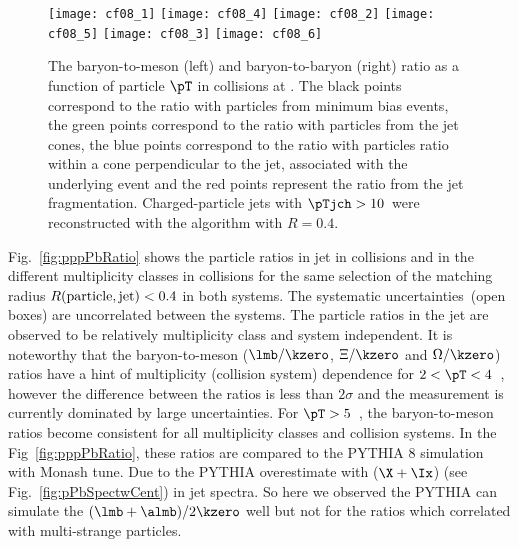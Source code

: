 \documentclass[ALICE,manyauthors]{cernphprep}
\begin{document}
\begin{figure}[!ht]
	\begin{center}
		\texttt{[image: cf08\_1]}
		\texttt{[image: cf08\_4]}
		\texttt{[image: cf08\_2]}
		\texttt{[image: cf08\_5]}
		\texttt{[image: cf08\_3]}
		\texttt{[image: cf08\_6]}
	\end{center}
	\caption{The baryon-to-meson (left) and baryon-to-baryon (right) ratio as a function of particle $\pT$ in \pPb collisions at \fivenn. The black points correspond to the ratio with particles from minimum bias events, the green points correspond to the ratio with particles from the jet cones, the blue points correspond to the ratio with particles ratio within a cone perpendicular to the jet, associated with the underlying event and the red points represent the ratio from the jet fragmentation. Charged-particle jets with $\pTjch > 10$~\GeVc were reconstructed with the \akT algorithm with $R = 0.4$.}
	\label{fig:pPbRatio}
\end{figure}

Fig.~\ref{fig:pppPbRatio} shows the particle ratios in jet in \pp collisions and in the different multiplicity classes in \pPb collisions for the same selection of the matching radius $R(\rm{particle, jet}) < 0.4$ in both systems.
The systematic uncertainties~(open boxes) are uncorrelated between the systems.
The particle ratios in the jet are observed to be relatively multiplicity class and system independent.
It is noteworthy that the baryon-to-meson ($\lmb/\kzero$, $\Xi/\kzero$ and $\Omega/\kzero$) ratios have a hint of multiplicity (collision system) dependence for $2 < \pT < 4$~\GeVc, however the difference between the ratios is less than $2\sigma$ and the measurement is currently dominated by large uncertainties.
For $\pT > 5$~\GeVc, the baryon-to-meson ratios become consistent for all multiplicity classes and collision systems.
In the Fig~\ref{fig:pppPbRatio}, these ratios are compared to the PYTHIA 8 simulation with Monash tune. Due to the PYTHIA overestimate with ($\X + \Ix$) (see Fig.~\ref{fig:pPbSpectwCent}) in jet spectra. So here we observed the PYTHIA can simulate the $(\lmb + \almb)/2\kzero$ well but not for the ratios which correlated with multi-strange particles.
\end{document}
